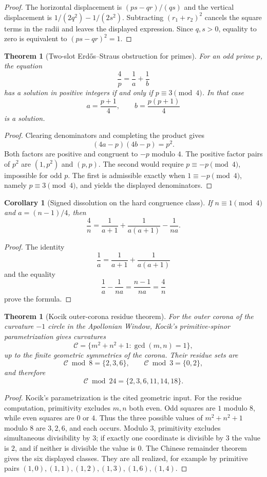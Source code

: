 \documentclass[11pt]{article}
\newtheorem{theorem}[definition]{Theorem}
\newtheorem{corollary}[definition]{Corollary}
\begin{document}
\begin{proof}
The horizontal displacement is $(ps-qr)/(qs)$ and the vertical displacement is $1/(2q^2)-1/(2s^2)$.  Subtracting $(r_1+r_2)^2$ cancels the square terms in the radii and leaves the displayed expression.  Since $q,s>0$, equality to zero is equivalent to $(ps-qr)^2=1$.
\end{proof}

\begin{theorem}[Two-slot Erd\H{o}s--Straus obstruction for primes]
For an odd prime $p$, the equation
\[
\frac4p=\frac1a+\frac1b
\]
has a solution in positive integers if and only if $p\equiv3\pmod4$.  In that case
\[
a=\frac{p+1}{4},\qquad b=\frac{p(p+1)}4
\]
is a solution.
\end{theorem}

\begin{proof}
Clearing denominators and completing the product gives
\[
(4a-p)(4b-p)=p^2.
\]
Both factors are positive and congruent to $-p$ modulo $4$.  The positive factor pairs of $p^2$ are $(1,p^2)$ and $(p,p)$.  The second would require $p\equiv-p\pmod4$, impossible for odd $p$.  The first is admissible exactly when $1\equiv-p\pmod4$, namely $p\equiv3\pmod4$, and yields the displayed denominators.
\end{proof}

\begin{corollary}[Signed dissolution on the hard congruence class]
If $n\equiv1\pmod4$ and $a=(n-1)/4$, then
\[
\frac4n
=
\frac1{a+1}+\frac1{a(a+1)}-\frac1{na}.
\]
\end{corollary}

\begin{proof}
The identity
\[
\frac1a=\frac1{a+1}+\frac1{a(a+1)}
\]
and the equality
\[
\frac1a-\frac1{na}=\frac{n-1}{na}=\frac4n
\]
prove the formula.
\end{proof}

\begin{theorem}[Kocik outer-corona residue theorem]
For the outer corona of the curvature $-1$ circle in the Apollonian Window, Kocik's primitive-spinor parametrization gives curvatures
\[
\mathcal C=\{m^2+n^2+1:\gcd(m,n)=1\},
\]
up to the finite geometric symmetries of the corona.  Their residue sets are
\[
\mathcal C\bmod8=\{2,3,6\},
\qquad
\mathcal C\bmod3=\{0,2\},
\]
and therefore
\[
\mathcal C\bmod24=\{2,3,6,11,14,18\}.
\]
\end{theorem}

\begin{proof}
Kocik's parametrization is the cited geometric input.  For the residue computation, primitivity excludes $m,n$ both even.  Odd squares are $1$ modulo $8$, while even squares are $0$ or $4$.  Thus the three possible values of $m^2+n^2+1$ modulo $8$ are $3,2,6$, and each occurs.  Modulo $3$, primitivity excludes simultaneous divisibility by $3$; if exactly one coordinate is divisible by $3$ the value is $2$, and if neither is divisible the value is $0$.  The Chinese remainder theorem gives the six displayed classes.  They are all realized, for example by primitive pairs $(1,0),(1,1),(1,2),(1,3),(1,6),(1,4)$.
\end{proof}
\end{document}
